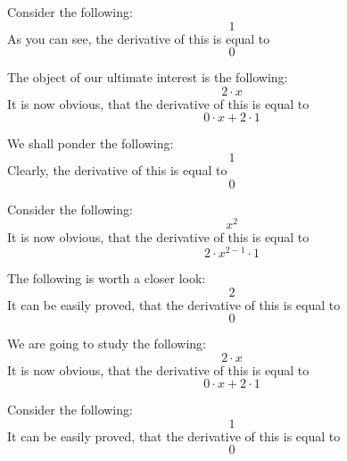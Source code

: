 \documentclass{article}
\begin{document}
Consider the following:
\begin{equation}
1 
\end{equation}
As you can see, the derivative of this is equal to
\begin{equation}
0 
\end{equation}

The object of our ultimate interest is the following:
\begin{equation}
2 \cdot x 
\end{equation}
It is now obvious, that the derivative of this is equal to
\begin{equation}
0 \cdot x + 2 \cdot 1 
\end{equation}

We shall ponder the following:
\begin{equation}
1 
\end{equation}
Clearly, the derivative of this is equal to
\begin{equation}
0 
\end{equation}

Consider the following:
\begin{equation}
x ^{2 } 
\end{equation}
It is now obvious, that the derivative of this is equal to
\begin{equation}
2 \cdot x ^{2 - 1 } \cdot 1 
\end{equation}

The following is worth a closer look:
\begin{equation}
2 
\end{equation}
It can be easily proved, that the derivative of this is equal to
\begin{equation}
0 
\end{equation}

We are going to study the following:
\begin{equation}
2 \cdot x 
\end{equation}
It is now obvious, that the derivative of this is equal to
\begin{equation}
0 \cdot x + 2 \cdot 1 
\end{equation}

Consider the following:
\begin{equation}
1 
\end{equation}
It can be easily proved, that the derivative of this is equal to
\begin{equation}
0 
\end{equation}
\end{document}
